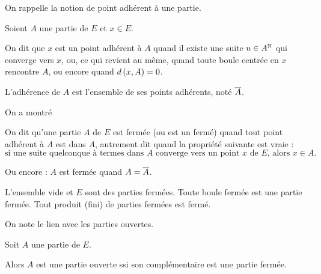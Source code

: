 On rappelle la notion de point adhérent à une partie.

\begin{defi}
Soient \(A\) une partie de \(E\) et \(x\in E\).

On dit que \(x\) est un point adhérent à \(A\) quand il existe une suite \(u\in A^{\mathbb{N}}\) qui converge vers \(x\), ou, ce qui revient au même, quand toute boule centrée en \(x\) rencontre \(A\), ou encore quand \(d\left(x,A\right)=0\).

L'adhérence de \(A\) est l'ensemble de ses points adhérents, noté \(\overline{A}\).
\end{defi}

On a montré

\begin{defi}
On dit qu'une partie \(A\) de \(E\) est fermée (ou est un fermé) quand tout point adhérent à \(A\) est dans \(A\), autrement dit quand la propriété suivante est vraie : \[\text{si une suite quelconque à termes dans }A\text{ converge vers un point }x\text{ de }E\text{, alors }x\in A.\]

Ou encore : \(A\) est fermée quand \(A=\overline{A}\).
\end{defi}

\begin{prop}
L'ensemble vide et \(E\) sont des parties fermées. Toute boule fermée est une partie fermée. Tout produit (fini) de parties fermées est fermé.
\end{prop}

On note le lien avec les parties ouvertes.

\begin{prop}
Soit \(A\) une partie de \(E\).

Alors \(A\) est une partie ouverte ssi son complémentaire est une partie fermée.
\end{prop}

